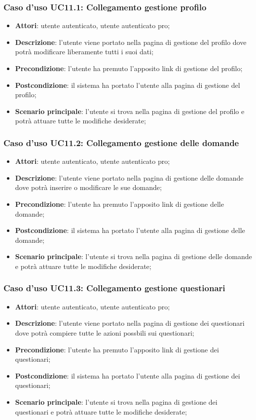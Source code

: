 \subsubsection{Caso d'uso UC11.1: Collegamento gestione profilo}
\begin{itemize}
\item\textbf{Attori}: utente autenticato, utente autenticato pro;
\item\textbf{Descrizione}: l'utente viene portato nella pagina di gestione del profilo dove potrà modificare liberamente tutti i suoi dati;
\item\textbf{Precondizione}: l'utente ha premuto l'apposito link di gestione del profilo;
\item\textbf{Postcondizione}: il sistema ha portato l'utente alla pagina di gestione del profilo;
\item\textbf{Scenario principale}: l'utente si trova nella pagina di gestione del profilo e potrà attuare tutte le modifiche desiderate;
\end{itemize}

\subsubsection{Caso d'uso UC11.2: Collegamento gestione delle domande}
\begin{itemize}
\item\textbf{Attori}: utente autenticato, utente autenticato pro;
\item\textbf{Descrizione}: l'utente viene portato nella pagina di gestione delle domande dove potrà inserire o modificare le sue domande;
\item\textbf{Precondizione}: l'utente ha premuto l'apposito link di gestione delle domande;
\item\textbf{Postcondizione}: il sistema ha portato l'utente alla pagina di gestione delle domande;
\item\textbf{Scenario principale}: l'utente si trova nella pagina di gestione delle domande e potrà attuare tutte le modifiche desiderate;
\end{itemize}

\subsubsection{Caso d'uso UC11.3: Collegamento gestione questionari}
\begin{itemize}
\item\textbf{Attori}: utente autenticato, utente autenticato pro;
\item\textbf{Descrizione}: l'utente viene portato nella pagina di gestione dei questionari dove potrà compiere tutte le azioni possbili sui questionari;
\item\textbf{Precondizione}: l'utente ha premuto l'apposito link di gestione dei questionari;
\item\textbf{Postcondizione}: il sistema ha portato l'utente alla pagina di gestione dei questionari;
\item\textbf{Scenario principale}: l'utente si trova nella pagina di gestione dei questionari e potrà attuare tutte le modifiche desiderate;
\end{itemize}

